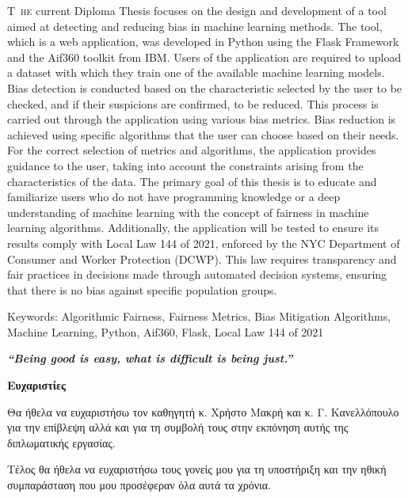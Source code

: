 \documentclass[12pt,twoside]{article}
\newcommand{\en}{\selectlanguage{english}}
\newcommand{\gr}{\selectlanguage{greek}}
\begin{document}
\lettrine [loversize = 0.03] {\en T} {\ he} current Diploma Thesis focuses on the design and development of a tool aimed at detecting and reducing bias in machine learning methods. The tool, which is a web application, was developed in Python using the Flask Framework and the Aif360 toolkit from IBM. Users of the application are required to upload a dataset with which they train one of the available machine learning models. Bias detection is conducted based on the characteristic selected by the user to be checked, and if their suspicions are confirmed, to be reduced. This process is carried out through the application using various bias metrics. Bias reduction is achieved using specific algorithms that the user can choose based on their needs. For the correct selection of metrics and algorithms, the application provides guidance to the user, taking into account the constraints arising from the characteristics of the data. The primary goal of this thesis is to educate and familiarize users who do not have programming knowledge or a deep understanding of machine learning with the concept of fairness in machine learning algorithms. Additionally, the application will be tested to ensure its results comply with Local Law 144 of 2021, enforced by the NYC Department of Consumer and Worker Protection (DCWP). This law requires transparency and fair practices in decisions made through automated decision systems, ensuring that there is no bias against specific population groups.
\\
\par{\large{\en Keywords: Algorithmic Fairness, Fairness Metrics, Bias Mitigation Algorithms, Machine Learning, Python, Aif360, Flask, Local Law 144 of 2021}}

\newpage\null
\thispagestyle{plain}
\vspace*{\fill}
\begin{center}
\begin{minipage}{.6\textwidth}
\centering \textbf{\en\textit{ “Being good is easy, what is difficult is being just.”}
}%
\end{minipage}
\end{center}
\vfill

\newpage
\thispagestyle{plain}
\par{\Large{ \textbf{\gr Ευχαριστίες}}}
\par{}
\gr Θα ήθελα να ευχαριστήσω τον καθηγητή  κ. Χρήστο Μακρή και κ. Γ. Κανελλόπουλο για την επίβλεψη  αλλά και για τη συμβολή τους στην εκπόνηση αυτής της διπλωματικής εργασίας.
\par{}
Τέλος θα ήθελα να ευχαριστήσω τους γονείς μου για τη υποστήριξη και την ηθική συμπαράσταση που μου προσέφεραν όλα αυτά τα χρόνια.
\end{document}

